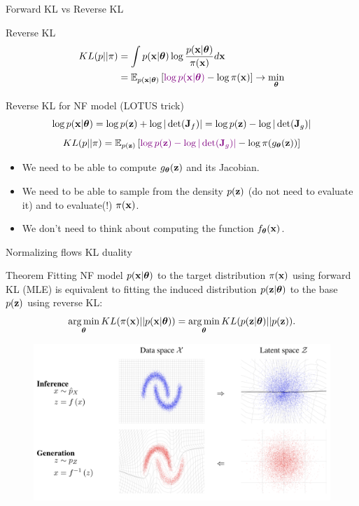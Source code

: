 \begin{frame}{Forward KL vs Reverse KL}
	\begin{block}{Reverse KL}
	  	\vspace{-0.5cm}
			\begin{align*}
				KL(p || \pi) &= \int p(\mathbf{x} | \boldsymbol{\theta}) \log \frac{p(\mathbf{x} | \boldsymbol{\theta})}{\pi(\mathbf{x})} d \mathbf{x} \\
				&= \mathbb{E}_{p(\mathbf{x} | \boldsymbol{\theta})} \left[{\color{violet}\log p(\mathbf{x} | \boldsymbol{\theta})} - \log \pi(\mathbf{x})\right] \rightarrow \min_{\boldsymbol{\theta}}
			\end{align*}
		\vspace{-0.7cm}
	\end{block}
	\begin{block}{Reverse KL for NF model (LOTUS trick)}
  		\vspace{-0.3cm}
		\[
			 \log p(\mathbf{x} | \boldsymbol{\theta}) = \log p(\mathbf{z}) +  \log  |\det (\mathbf{J}_f)| = \log p(\mathbf{z}) - \log |\det (\mathbf{J}_g)| 
		\]
		\[
			KL(p || \pi)  = \mathbb{E}_{p(\mathbf{z})} \left[ {\color{violet} \log p(\mathbf{z}) -  \log |\det (\mathbf{J}_g)| } - \log \pi(g_{\boldsymbol{\theta}}(\mathbf{z})) \right]
		\]
		\vspace{-0.3cm}
		\begin{itemize}
		\item We need to be able to compute $g_{\boldsymbol{\theta}}(\mathbf{z})$ and its Jacobian.
		\item We need to be able to sample from the density $p(\mathbf{z})$ (do not need to evaluate it) and to evaluate(!) $\pi(\mathbf{x})$.
		\item We don’t need to think about computing the function $f_{\boldsymbol{\theta}}(\mathbf{x})$.
		\end{itemize}
	\end{block}
\end{frame}
\begin{frame}{Normalizing flows KL duality}
	\begin{block}{Theorem}
		Fitting NF model $p(\mathbf{x}| \boldsymbol{\theta})$ to the target distribution $\pi(\mathbf{x})$ using forward KL (MLE) is equivalent to fitting the induced distribution $p(\mathbf{z}| \boldsymbol{\theta})$ to the base $p(\mathbf{z})$ using reverse KL:
		\vspace{-0.2cm}
		\[
			\operatorname*{arg\,min}_{\boldsymbol{\theta}} KL(\pi(\mathbf{x}) || p(\mathbf{x} | \boldsymbol{\theta})) = \operatorname*{arg\,min}_{\boldsymbol{\theta}} KL(p(\mathbf{z} | \boldsymbol{\theta}) || p(\mathbf{z})).
		\]
		\vspace{-0.7cm}
	\end{block}
	\begin{figure}
		\includegraphics[width=0.85\linewidth]{figs/flows_how2}
	\end{figure}
\end{frame}
